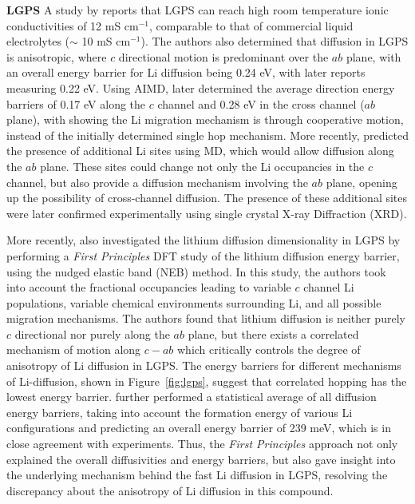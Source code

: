 \documentclass[../main.tex]{subfiles}
\begin{document}
\textbf{LGPS}
A study by \citeauthor{Kamaya2011} reports that LGPS can reach high room temperature ionic conductivities of 12 mS cm$^{-1}$, comparable to that of commercial liquid electrolytes ($\sim$ 10 mS cm$^{-1}$).\cite{Kamaya2011} The authors also determined that diffusion in LGPS is anisotropic, where $c$ directional motion is predominant over the $ab$ plane, with an overall energy barrier for Li diffusion being 0.24 eV, with later reports measuring 0.22 eV.\cite{Kuhn2013b} Using AIMD, \citeauthor{Mo2012} later determined the average direction energy barriers of 0.17 eV along the $c$ channel and 0.28 eV in the cross channel ($ab$ plane), \cite{Mo2012} with \citeauthor{Xu2012one} showing the Li migration mechanism is through cooperative motion, instead of the initially determined single hop mechanism.\cite{Xu2012one} More recently, \citeauthor{Adams2012} predicted the presence of additional Li sites using MD, which would allow diffusion along the $ab$ plane.\cite{Adams2012} These sites could change not only the Li occupancies in the $c$ channel, but also provide a diffusion mechanism involving the $ab$ plane, opening up the possibility of cross-channel diffusion. The presence of these additional sites were later confirmed experimentally using single crystal X-ray Diffraction (XRD).\cite{Kuhn2013a}

More recently, \citeauthor{Bhandari2016} also investigated the lithium diffusion dimensionality in LGPS by performing a \textit{First Principles} DFT study of the lithium diffusion energy barrier, using the nudged elastic band (NEB) method.\cite{Bhandari2016} In this study, the authors took into account the fractional occupancies leading to variable $c$ channel Li populations, variable chemical environments surrounding Li, and all possible migration mechanisms. The authors found that lithium diffusion is neither purely $c$ directional nor purely along the $ab$ plane, but there exists a correlated mechanism of motion along $c-ab$ which critically controls the degree of anisotropy of Li diffusion in LGPS. The energy barriers for different mechanisms of Li-diffusion, shown in Figure~\ref{fig:lgps}, suggest that correlated hopping has the lowest energy barrier. \citeauthor{Bhandari2016} further performed a statistical average of all diffusion energy barriers, taking into account the formation energy of various Li configurations and predicting an overall energy barrier of 239 meV,\cite{Bhandari2016} which is in close agreement with experiments.\cite{Kamaya2011} Thus, the \textit{First Principles} approach not only explained the overall diffusivities and energy barriers, but also gave insight into the underlying mechanism behind the fast Li diffusion in LGPS, resolving the discrepancy about the anisotropy of Li diffusion in this compound.
\end{document}
